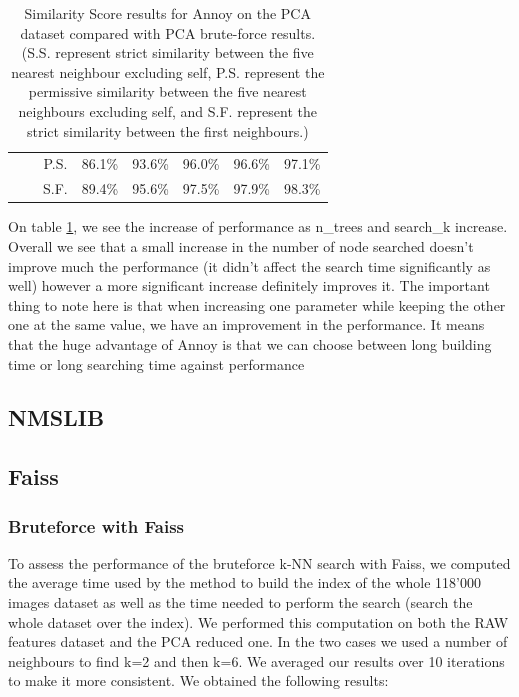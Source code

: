 \documentclass[a4paper]{article}
\begin{document}
\begin{table}[h]
\begin{tabular}{ c  c  c | c | c | c | c | c |}
		\cline{3-8}
		\multicolumn{1}{|c|}{} & \multicolumn{1}{|c|}{} & P.S. & 86.1\% & 93.6\% & 96.0\% & 96.6\% & 97.1\% \\
		\cline{3-8}
		\multicolumn{1}{|c|}{} & \multicolumn{1}{|c|}{} & S.F. & 89.4\% & 95.6\% & 97.5\% & 97.9\% & 98.3\% \\
		\cline{1-8}
	\end{tabular}
	\caption{Similarity Score results for Annoy on the PCA dataset compared with PCA brute-force results. (S.S. represent strict similarity between the five nearest neighbour excluding self, P.S. represent the permissive similarity between the five nearest neighbours excluding self, and S.F. represent the strict similarity between the first neighbours.)}
	\label{table:benchmark-sim-annoy}
\end{table}

On table \ref{table:benchmark-sim-annoy}, we see the increase of performance as n\_trees and search\_k increase. Overall we see that a small increase in the number of node searched doesn't improve much the performance (it didn't affect the search time significantly as well) however a more significant increase definitely improves it. The important thing to note here is that when increasing one parameter while keeping the other one at the same value, we have an improvement in the performance. It means that the huge advantage of Annoy is that we can choose between long building time or long searching time against performance

	\subsection{NMSLIB}
	\subsection{Faiss}

\subsubsection{Bruteforce with Faiss}

To assess the performance of the bruteforce k-NN search with Faiss, we computed the average time used by the method to build the index of the whole 118'000 images dataset as well as the time needed to perform the search (search the whole dataset over the index). We performed this computation on both the RAW features dataset and the PCA reduced one. In the two cases we used a number of neighbours to find k=2 and then k=6. We averaged our results over 10 iterations to make it more consistent. We obtained the following results:
\end{document}
